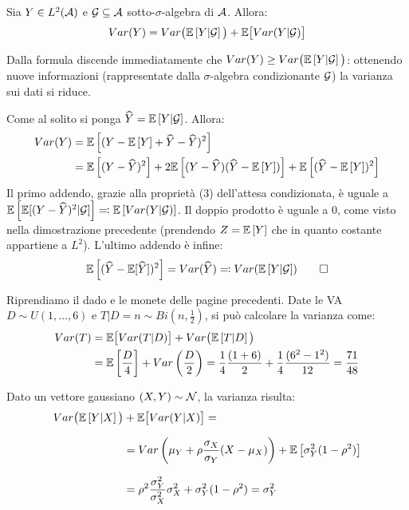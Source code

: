 \begin{prop}\label{scomp-var}
  Sia $Y \in L^2(\mathcal A)$ e $\mathcal G \subseteq \mathcal A$ sotto-$\sigma$-algebra di $\mathcal A$. Allora:
  $$Var(Y) = Var\big( \mathbb E \left[ Y|\mathcal G \right] \big)+\mathbb E \big[ Var(Y|\mathcal G) \big]$$
\end{prop}
Dalla formula discende immediatamente che $Var(Y) \geq Var \big( \mathbb E \left[ Y|\mathcal G \right] \big)$: ottenendo nuove informazioni (rappresentate dalla $\sigma$-algebra condizionante $\mathcal G$) la varianza sui dati si riduce.
\begin{dimo}
  Come al solito si ponga $\widehat Y = \mathbb E \left[ Y|\mathcal G \right]$. Allora:
  \begin{align*}
    Var(Y) &= \mathbb E \left[  (Y - \mathbb E \left[ Y \right] + \widehat Y -\widehat Y)^2  \right] \\
    &= \mathbb E \left[  (Y-\widehat Y)^2  \right] + 2\mathbb E \left[  (Y-\widehat Y)(\widehat Y - \mathbb E \left[ Y \right])  \right] + \mathbb E \left[  (\widehat Y - \mathbb E \left[ Y \right])^2  \right]
  \end{align*}
  Il primo addendo, grazie alla proprietà (3) dell'attesa condizionata, è uguale a $\mathbb E \left[ \mathbb E[(Y-\widehat Y)^2| \mathcal G ] \right] \eqqcolon \mathbb E \left[ Var(Y|\mathcal G) \right]$.
  Il doppio prodotto è uguale a $0$, come visto nella dimostrazione precedente (prendendo $Z = \mathbb E \left[ Y \right]$ che in quanto costante appartiene a $L^2$).
  L'ultimo addendo è infine:
	$$\mathbb E \left[  (\widehat Y - \mathbb E [\widehat Y])^2  \right] = Var(\widehat Y) \eqqcolon Var(\mathbb E \left[ Y|\mathcal G \right]) \qedhere$$
\end{dimo}

\medskip
\begin{ese}
  Riprendiamo il dado e le monete delle pagine precedenti. Date le VA $D \sim U({1,\dots,6})$ e $T|D=n \sim Bi\left(n, \frac 1 2\right)$, si può calcolare la varianza come:
  \begin{align*}
  Var(T) &= \EE \big[Var(T|D) \big] + Var \big( \Ex{T|D} \big) %
  \\%
  &= \Ex{\frac D 4} + Var\left(\frac D 2 \right) %
  = \frac 1 4 \frac{(1+6)}{2} + \frac 1 4 \frac{(6^2-1^2)}{12} = \frac{71}{48}
  \end{align*}
\end{ese}

\medskip
\begin{ese}
  Dato un vettore gaussiano $(X,Y) \sim \mathcal N$, la varianza risulta:
  \begin{align*}
  Var \big( \mathbb E \left[ Y|X \right] \big) &+ \mathbb E \big[ Var(Y|X) \big] =\\[7pt]
  &= Var\left(\mu_Y + \rho \frac{\sigma_X}{\sigma_Y}(X-\mu_X)\right) + \mathbb E \left[  \sigma_Y^2(1-\rho^2)  \right]\\[7pt]
  &= \rho^2 \frac{\sigma_Y^2}{\sigma_X^2} \sigma_X^2 + \sigma_Y^2(1-\rho^2) = \sigma_Y^2
  \end{align*}
\end{ese}

\cleardoublepage

